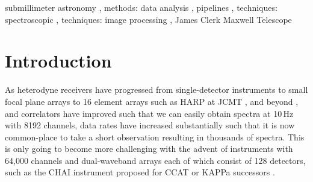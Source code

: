 \documentclass[final,authoryear,5p,times,twocolumn]{elsarticle}
\begin{document}
\begin{frontmatter}
\begin{abstract}
\end{abstract}

\begin{keyword}


submillimeter astronomy \sep
methods: data analysis \sep
pipelines \sep
techniques: spectroscopic \sep
techniques: image processing \sep
James Clerk Maxwell Telescope

\end{keyword}

\end{frontmatter}


\newcommand{\mnras}{Mon Not R Astron Soc}
\newcommand{\aap}{Astron Astrophys}
\newcommand{\aaps}{Astron Astrophys Suppl}
\newcommand{\pasp}{Pub Astron Soc Pacific}
\newcommand{\apj}{Astrophys J}
\newcommand{\apjs}{Astrophys J Supp}
\newcommand{\qjras}{Quart J R Astron Soc}
\newcommand{\an}{Astron.\ Nach.}
\newcommand{\ijimw}{Int.\ J.\ Infrared \& Millimeter Waves}
\newcommand{\procspie}{Proc.\ SPIE}
\newcommand{\aspconf}{ASP Conf. Ser.}

\newcommand{\KAPPA}{\textsc{kappa}}
\newcommand{\specx}{\textsc{specx}}
\newcommand{\cupid}{\textsc{cupid}}
\newcommand{\smurf}{\textsc{smurf}}

\newcommand{\makecube}{\textsc{makecube}}
\newcommand{\unmakecube}{\textsc{unmakecube}}
\newcommand{\mfittrend}{\textsc{mfittrend}}
\newcommand{\gsdacsis}{\textsc{gsd{\footnotesize{2}}acsis}}
\newcommand{\findback}{\textsc{findback}}
\newcommand{\findclumps}{\textsc{findclumps}}
\newcommand{\fixsteps}{\textsc{fixsteps}}

\newcommand{\ascl}[1]{\href{http://www.ascl.net/#1}{ascl:#1}}

\section{Introduction}
\label{sec:intro}

As heterodyne receivers have progressed from single-detector
instruments
\citep{1992IJIMW..13.1487P,1992IJIMW..13..647D,1992IJIMW..13.1827C} to
small focal plane arrays
\citep{2003SPIE.4855..322G,2004A&A...423.1171S} to 16 element arrays
such as HARP at JCMT \citep{2009MNRAS.399.1026B}, and beyond
\citep{2012SPIE.8452E..04K,2014SPIE.9153E..27H}, and correlators have improved such that
we can easily obtain spectra at 10\,Hz with 8192 channels, data rates
have increased substantially such that it is now common-place to take
a short observation resulting in thousands of spectra. This is only
going to become more challenging with the advent of instruments with
64,000 channels and dual-waveband arrays each of which consist of 128
detectors, such as the CHAI instrument proposed for CCAT
\citep{2014SPIE9152-109}
or KAPPa successors \citep{2014SPIE.9153E..0KW}.
\end{document}
